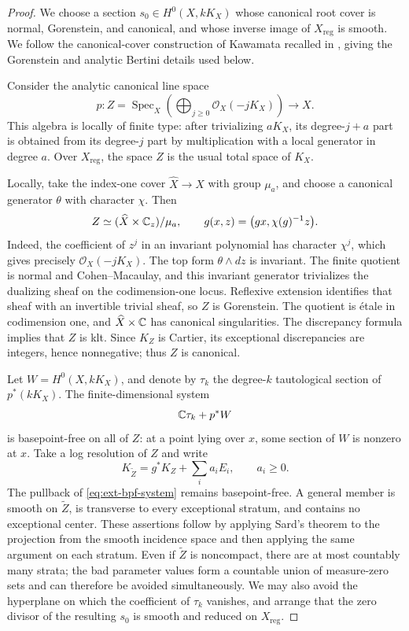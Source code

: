 \documentclass[11pt,a4paper]{article}
\theoremstyle{definition}\newtheorem{definition}[theorem]{Definition}
\theoremstyle{remark}\newtheorem*{remark}{Remark}
\newcommand{\OO}{\mathcal O}
\newcommand{\Spec}{\operatorname{Spec}}\newcommand{\Proj}{\operatorname{Proj}}
\begin{document}
\begin{proof}
We choose a section $s_0\in H^0(X,kK_X)$ whose canonical root cover
is normal, Gorenstein, and canonical, and whose inverse image of
$X_{\mathrm{reg}}$ is smooth.
We follow the canonical-cover construction of Kawamata recalled in
\cite[Lemma~12.5.10]{KM1992}, giving the Gorenstein and analytic
Bertini details used below.

Consider the analytic canonical line space
\begin{equation}\label{eq:ext-canonical-line-space}
 p:Z=\Spec_X\left(\bigoplus_{j\ge0}\OO_X(-jK_X)\right)\longrightarrow X.
\end{equation}
This algebra is locally of finite type: after trivializing $aK_X$, its
degree-$j+a$ part is obtained from its degree-$j$ part by multiplication
with a local generator in degree $a$. Over $X_{\mathrm{reg}}$, the space
$Z$ is the usual total space of $K_X$.

Locally, take the index-one cover $\widehat X\to X$ with group $\mu_a$,
and choose a canonical generator $\theta$ with character $\chi$. Then
\begin{equation}\label{eq:ext-line-quotient}
 Z\simeq(\widehat X\times\mathbb C_z)/\mu_a,\qquad
 g(x,z)=\bigl(gx,\chi(g)^{-1}z\bigr).
\end{equation}
Indeed, the coefficient of $z^j$ in an invariant polynomial has character
$\chi^j$, which gives precisely $\OO_X(-jK_X)$.
The top form $\theta\wedge dz$ is invariant. The finite quotient is normal
and Cohen--Macaulay, and this invariant generator trivializes the dualizing
sheaf on the codimension-one locus. Reflexive extension identifies that
sheaf with an invertible trivial sheaf, so $Z$ is Gorenstein.
The quotient is étale in codimension one, and
$\widehat X\times\mathbb C$ has canonical singularities.
The discrepancy formula implies that $Z$ is klt. Since $K_Z$ is Cartier,
its exceptional discrepancies are integers, hence nonnegative; thus $Z$
is canonical.

Let $W=H^0(X,kK_X)$, and denote by $\tau_k$ the degree-$k$ tautological
section of $p^*(kK_X)$. The finite-dimensional system
\begin{equation}\label{eq:ext-bpf-system}
 \mathbb C\tau_k+p^*W
\end{equation}
is basepoint-free on all of $Z$: at a point lying over $x$, some section
of $W$ is nonzero at $x$. Take a log resolution of $Z$ and write
\[
 K_{\widetilde Z}=g^*K_Z+\sum_i a_iE_i,\qquad a_i\ge0.
\]
The pullback of \eqref{eq:ext-bpf-system} remains basepoint-free.
A general member is smooth on $\widetilde Z$, is transverse to every
exceptional stratum, and contains no exceptional center.
These assertions follow by applying Sard's theorem to the projection
from the smooth incidence space and then applying the same argument on
each stratum. Even if $\widetilde Z$ is noncompact, there are at most
countably many strata; the bad parameter values form a countable union
of measure-zero sets and can therefore be avoided simultaneously.
We may also avoid the hyperplane on which the coefficient of $\tau_k$
vanishes, and arrange that the zero divisor of the resulting $s_0$ is
smooth and reduced on $X_{\mathrm{reg}}$.


\end{proof}
\end{document}
